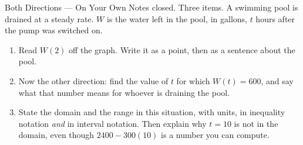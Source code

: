 \documentclass[10pt]{article}
\begin{document}

\vspace{0.15in}

\begin{notesbox}{Both Directions --- On Your Own}
\small
Notes closed. Three items. A swimming pool is drained at a steady rate. $W$ is the water left in
the pool, in gallons, $t$ hours after the pump was switched on.

\begin{center}
\end{center}

\begin{enumerate}[leftmargin=1.6em, itemsep=8pt, topsep=4pt]

\item Read $W(2)$ off the graph. Write it as a point, then as a sentence about the pool.


\item Now the other direction: find the value of $t$ for which $W(t)=600$, and say what that
number means for whoever is draining the pool.


\item State the domain and the range in this situation, with units, in inequality notation
\emph{and} in interval notation. Then explain why $t=10$ is not in the domain, even though
$2400-300(10)$ is a number you can compute.


\end{enumerate}
\end{notesbox}
\end{document}
